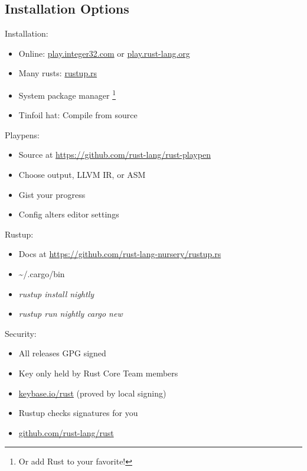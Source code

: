 \documentclass[100pt]{beamer}
\begin{document}
\subsection{Installation Options}

\begin{frame}
    Installation:
    \begin{itemize}
        \item Online: \url{play.integer32.com} or \url{play.rust-lang.org}
        \item Many rusts: \url{rustup.rs}
        \item System package manager \footnote{Or add Rust to your favorite!}
        \item Tinfoil hat: Compile from source
    \end{itemize}
\end{frame}

\begin{frame}
    Playpens:
    \begin{itemize}
        \item Source at \url{https://github.com/rust-lang/rust-playpen}
        \item Choose output, LLVM IR, or ASM
        \item Gist your progress
        \item Config alters editor settings
    \end{itemize}
\end{frame}

\begin{frame}
    Rustup:
    \begin{itemize}
        \item Docs at \url{https://github.com/rust-lang-nursery/rustup.rs}
        \item \textasciitilde /.cargo/bin
        \item \textit{rustup install nightly}
        \item \textit{rustup run nightly cargo new}
    \end{itemize}
\end{frame}

\begin{frame}
    Security:
    \begin{itemize}
        \item All releases GPG signed
        \item Key only held by Rust Core Team members
        \item \url{keybase.io/rust} (proved by local signing)
        \item Rustup checks signatures for you
        \item \url{github.com/rust-lang/rust}
    \end{itemize}
\end{frame}
\end{document}
